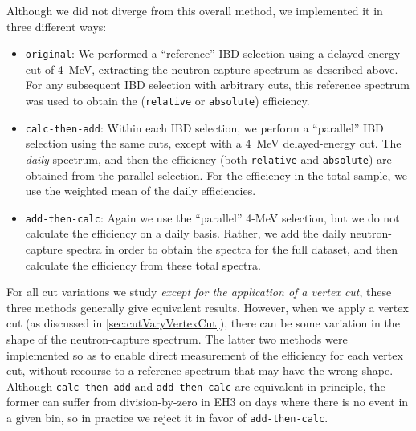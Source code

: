 \documentclass[../thesis.tex]{subfiles}
\begin{document}
Although we did not diverge from this overall method, we implemented it in three different ways:

\begin{itemize}
\item \texttt{original}: We performed a ``reference'' IBD selection using a delayed-energy cut of 4~MeV, extracting the neutron-capture spectrum as described above. For any subsequent IBD selection with arbitrary cuts, this reference spectrum was used to obtain the (\texttt{relative} or \texttt{absolute}) efficiency.
\item \texttt{calc-then-add}: Within each IBD selection, we perform a ``parallel'' IBD selection using the same cuts, except with a 4~MeV delayed-energy cut. The \emph{daily} spectrum, and then the efficiency (both \texttt{relative} and \texttt{absolute}) are obtained from the parallel selection. For the efficiency in the total sample, we use the weighted mean of the daily efficiencies.
\item \texttt{add-then-calc}: Again we use the ``parallel'' 4-MeV selection, but we do not calculate the efficiency on a daily basis. Rather, we add the daily neutron-capture spectra in order to obtain the spectra for the full dataset, and then calculate the efficiency from these total spectra.
\end{itemize}

For all cut variations we study \emph{except for the application of a vertex cut}, these three methods generally give equivalent results. However, when we apply a vertex cut (as discussed in \autoref{sec:cutVaryVertexCut}), there can be some variation in the shape of the neutron-capture spectrum. The latter two methods were implemented so as to enable direct measurement of the efficiency for each vertex cut, without recourse to a reference spectrum that may have the wrong shape. Although \texttt{calc-then-add} and \texttt{add-then-calc} are equivalent in principle, the former can suffer from division-by-zero in EH3 on days where there is no event in a given bin, so in practice we reject it in favor of \texttt{add-then-calc}.

\begin{comment}
In most of the results that follow, we show the outcome of using the \texttt{original} method, but the other methods give the same results. When we later discuss the application of vertex cuts, we will switch to the \texttt{add-then-calc} method (and will show the difficulties that result when attempting to use the \texttt{original} method).
\end{comment}
\end{document}
